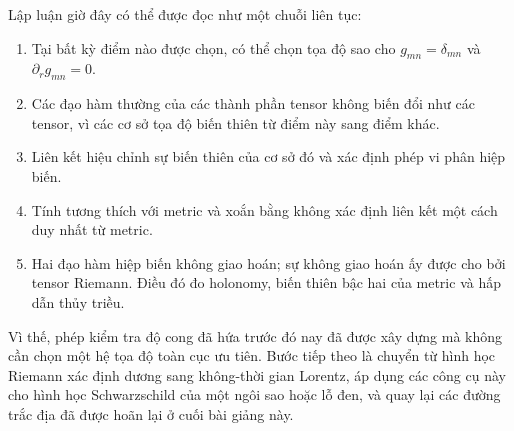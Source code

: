 Lập luận giờ đây có thể được đọc như một chuỗi liên tục:
\begin{enumerate}
 \item Tại bất kỳ điểm nào được chọn, có thể chọn tọa độ sao cho
 \(g_{mn}=\delta_{mn}\) và \(\partial_rg_{mn}=0\).
 \item Các đạo hàm thường của các thành phần tensor không biến đổi như
 các tensor, vì các cơ sở tọa độ biến thiên từ điểm này sang điểm khác.
 \item Liên kết hiệu chỉnh sự biến thiên của cơ sở đó và xác định
 phép vi phân hiệp biến.
 \item Tính tương thích với metric và xoắn bằng không xác định liên kết
 một cách duy nhất từ metric.
 \item Hai đạo hàm hiệp biến không giao hoán; sự không giao hoán ấy được cho bởi tensor Riemann.
 Điều đó đo holonomy, biến thiên bậc hai của metric và
 hấp dẫn thủy triều.
\end{enumerate}

Vì thế, phép kiểm tra độ cong đã hứa trước đó nay đã được xây dựng mà không cần chọn một hệ tọa độ toàn cục ưu tiên. Bước tiếp theo là chuyển từ hình học Riemann xác định dương sang không-thời gian Lorentz, áp dụng các công cụ này cho hình học Schwarzschild của một ngôi sao hoặc lỗ đen, và quay lại các đường trắc địa đã được hoãn lại ở cuối bài giảng này.
